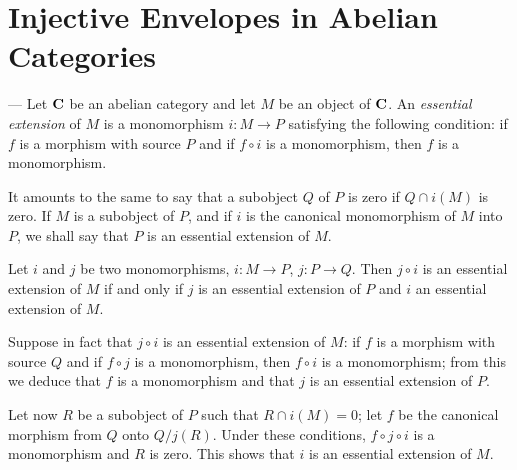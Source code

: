 %
%
\section{Injective Envelopes in Abelian Categories \cite{eckmann-schopf}}
--- Let $\mathbf{C}$ be an abelian category and let $M$ be an object of $\mathbf{C}$.
An \emph{essential extension} of $M$ is a monomorphism
$i\colon M\to P$ satisfying the following condition: if $f$ is a
morphism with source $P$ and if $f\circ i$ is a monomorphism, then $f$
is a monomorphism.

It amounts to the same to say that a subobject $Q$ of $P$ is zero if
$Q\cap i(M)$ is zero. If $M$ is a subobject of $P$, and if $i$ is the
canonical monomorphism of $M$ into $P$, we shall say that $P$ is an
essential extension of $M$.

\begin{lemma}
Let $i$ and $j$ be two monomorphisms, $i\colon M\to P$, $j\colon P\to
Q$. Then $j\circ i$ is an essential extension of $M$ if and only if
$j$ is an essential extension of $P$ and $i$ an essential extension of
$M$.
\end{lemma}

Suppose in fact that $j\circ i$ is an essential extension of $M$: if
$f$ is a morphism with source $Q$ and if $f\circ j$ is a
monomorphism, then $f\circ i$ is a monomorphism; from this we deduce
that $f$ is a monomorphism and that $j$ is an essential extension of
$P$.

Let now $R$ be a subobject of $P$ such that $R\cap i(M) = 0$; let $f$
be the canonical morphism from $Q$ onto $Q/j(R)$. Under these
conditions, $f\circ j\circ i$ is a monomorphism and $R$ is zero. This
shows that $i$ is an essential extension of $M$.

